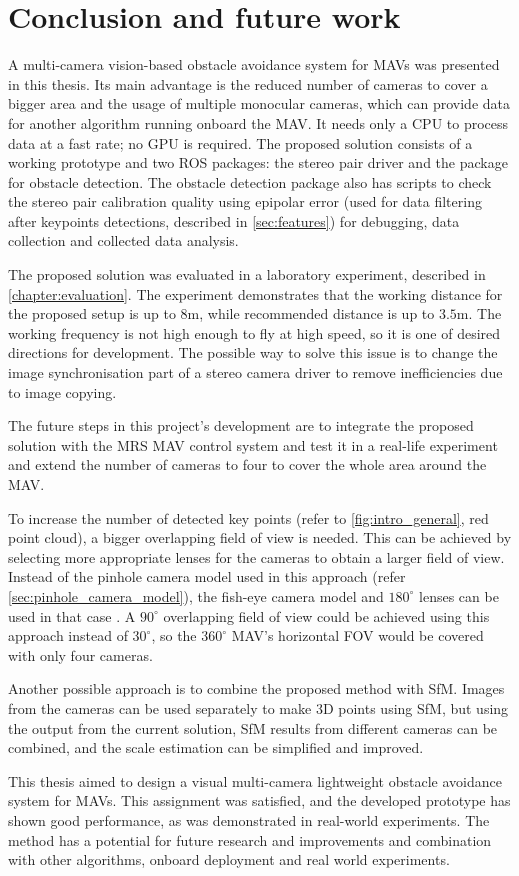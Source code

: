 \chapter{Conclusion and future work}
\label{chapter:conclusion}

A multi-camera vision-based obstacle avoidance system for MAVs was presented in this thesis. 
Its main advantage is the reduced number of cameras to cover a bigger area and the usage of multiple monocular cameras, which can provide data for another algorithm running onboard the MAV.
It needs only a CPU to process data at a fast rate; no GPU is required.
The proposed solution consists of a working prototype and two ROS packages: the stereo pair driver and the package for obstacle detection.
The obstacle detection package also has scripts to check the stereo pair calibration quality using epipolar error (used for data filtering after keypoints detections, described in \autoref{sec:features}) for debugging, data collection and collected data analysis.

The proposed solution was evaluated in a laboratory experiment, described in \autoref{chapter:evaluation}. 
The experiment demonstrates that the working distance for the proposed setup is up to $8$m, while recommended distance is up to $3.5$m. 
The working frequency is not high enough to fly at high speed, so it is one of desired directions for development.
The possible way to solve this issue is to change the image synchronisation part of a stereo camera driver to remove inefficiencies due to image copying.

The future steps in this project's development are to integrate the proposed solution with the MRS MAV control system and test it in a real-life experiment and extend the number of cameras to four to cover the whole area around the MAV.

To increase the number of detected key points (refer to \autoref{fig:intro_general}, red point cloud), a bigger overlapping field of view is needed.
This can be achieved by selecting more appropriate lenses for the cameras to obtain a larger field of view.
Instead of the pinhole camera model used in this approach (refer \autoref{sec:pinhole_camera_model}), the fish-eye camera model and $180^\circ$ lenses can be used in that case \cite{fish-eye}.
A $90^\circ$ overlapping field of view could be achieved using this approach instead of $30^\circ$, so the $360^\circ$ MAV's horizontal FOV would be covered with only four cameras.

Another possible approach is to combine the proposed method with SfM.
Images from the cameras can be used separately to make 3D points using SfM, but using the output from the current solution, SfM results from different cameras can be combined, and the scale estimation can be simplified and improved.

This thesis aimed to design a visual multi-camera lightweight obstacle avoidance system for MAVs. 
This assignment was satisfied, and the developed prototype has shown good performance, as was demonstrated in real-world experiments.
The method has a potential for future research and improvements and combination with other algorithms, onboard deployment and real world experiments.